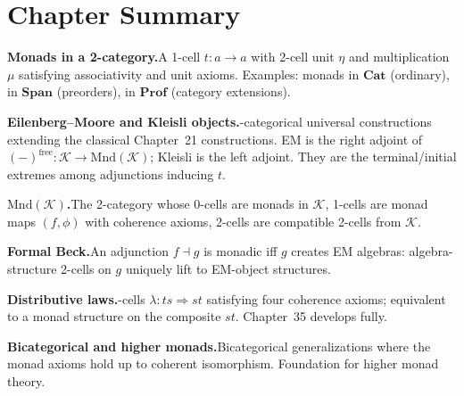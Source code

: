\begin{exercisesbox}
\begin{qa}
\end{qa}
\end{exercisesbox}


\section*{Chapter Summary}

\begin{summarybox}
\textbf{Monads in a 2-category.}\quad A 1-cell $t : a \to a$ with 2-cell
unit $\eta$ and multiplication $\mu$ satisfying associativity and unit
axioms. Examples: monads in $\mathbf{Cat}$ (ordinary), in $\mathbf{Span}$
(preorders), in $\mathbf{Prof}$ (category extensions).

\textbf{Eilenberg--Moore and Kleisli objects.}-categorical universal
constructions extending the classical Chapter~21 constructions. EM is the
right adjoint of $(-)^{\mathrm{free}} : \mathcal{K} \to \mathrm{Mnd}(\mathcal{K})$;
Kleisli is the left adjoint. They are the terminal/initial extremes among
adjunctions inducing $t$.

\textbf{$\mathrm{Mnd}(\mathcal{K})$.}\quad The 2-category whose 0-cells are
monads in $\mathcal{K}$, 1-cells are monad maps $(f, \phi)$ with coherence
axioms, 2-cells are compatible 2-cells from $\mathcal{K}$.

\textbf{Formal Beck.}\quad An adjunction $f \dashv g$ is monadic iff $g$
creates EM algebras: algebra-structure 2-cells on $g$ uniquely lift to
EM-object structures.

\textbf{Distributive laws.}-cells $\lambda : ts \Rightarrow st$
satisfying four coherence axioms; equivalent to a monad structure on the
composite $st$. Chapter~35 develops fully.

\textbf{Bicategorical and higher monads.}\quad Bicategorical generalizations
where the monad axioms hold up to coherent isomorphism. Foundation for
higher monad theory.
\end{summarybox}


